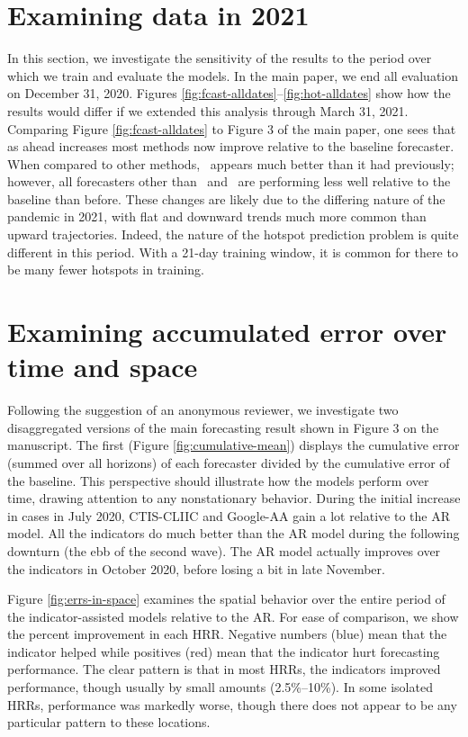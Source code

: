 \section{Examining data in 2021}

In this section, we investigate the sensitivity of the results to the
period over which we train and evaluate the models.  In the main
paper, we end all evaluation on December 31, 2020.  Figures
\ref{fig:fcast-alldates}--\ref{fig:hot-alldates} show how the
results would differ if we extended this analysis through March
  31, 2021. Comparing Figure \ref{fig:fcast-alldates} to Figure 3 of
the main paper, one sees that as ahead increases most methods now improve
relative to the baseline forecaster. When compared to other methods, 
\chngcli~appears much better than
it had previously; however, all forecasters other than \chngcov~and
\dv~are performing less well relative to the baseline than before.
These changes are likely due to the differing nature of the pandemic
in 2021, with flat and downward trends much more common than upward
trajectories.  Indeed, the nature of the hotspot prediction problem is
quite different in this period.  With a 21-day training window, it is
common for there to be many fewer hotspots in training.


\section{Examining accumulated error over time and space}

Following the suggestion of an anonymous reviewer, we investigate two
disaggregated versions of 
the main forecasting result shown in Figure 3 on the manuscript. The first
(Figure \ref{fig:cumulative-mean})
displays the cumulative error (summed over all horizons) of each forecaster
divided by the cumulative error 
of the baseline.
This perspective should illustrate how
the models perform over time, drawing attention to any nonstationary behavior.
During the initial increase in cases in July 2020, CTIS-CLIIC and Google-AA gain
a lot relative to the AR model. All the indicators do much better than the AR
model during the following downturn (the ebb of the second wave). The AR model
actually improves over the indicators in October 2020, before losing a bit in
late November.

Figure \ref{fig:errs-in-space} examines the spatial behavior over the entire
period of the indicator-assisted models relative to the AR. For ease of
comparison, we show the percent improvement in each HRR. Negative numbers (blue)
mean that the indicator helped while positives (red) mean that the indicator
hurt forecasting performance. The clear pattern is that in most HRRs, the
indicators improved performance, though usually by small amounts (2.5\%--10\%).
In some isolated HRRs, performance was markedly worse, though there does not
appear to be any particular pattern to these locations.



